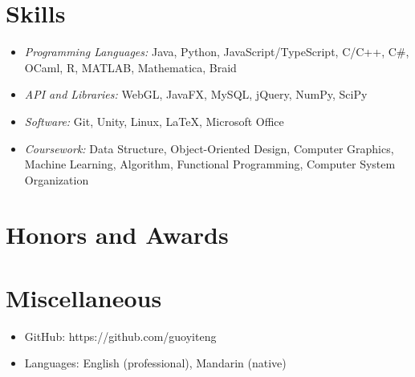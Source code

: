 \documentclass{resume}
\begin{document}

\section{Skills}
\begin{itemize}[parsep=0.5ex]
  \item \textit{Programming Languages:} Java, Python, JavaScript/TypeScript, C/C++, C\#, OCaml, R, MATLAB, Mathematica, Braid
  \item \textit{API and Libraries:} WebGL, JavaFX, MySQL, jQuery, NumPy, SciPy
  \item \textit{Software: }Git, Unity, Linux, \LaTeX, Microsoft Office
  \item \textit{Coursework: }Data Structure, Object-Oriented Design, Computer Graphics, Machine Learning, Algorithm, Functional Programming, Computer System Organization
\end{itemize}

\section{Honors and Awards}

\section{Miscellaneous}
\begin{itemize}[parsep=0.5ex]
  \item GitHub: https://github.com/guoyiteng
  \item Languages: English (professional), Mandarin (native)
\end{itemize}

%
%
\end{document}
